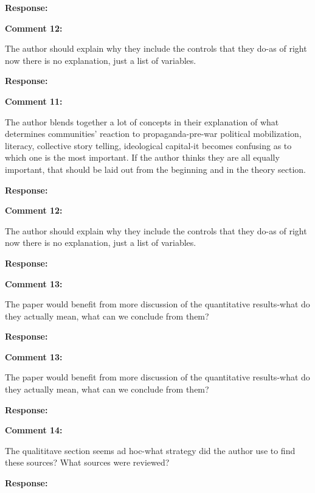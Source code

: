 \documentclass[12pt, a4paper, notitlepage]{article}
\begin{document}
\noindent\textbf{Response:}

\vspace{15pt}
\noindent\textbf{Comment 12:}
\begin{displayquote}
The author should explain why they include the controls that they do-as of right now there is no explanation, just a list of variables.
\end{displayquote}

\noindent\textbf{Response:}

\vspace{15pt}
\noindent\textbf{Comment 11:}
\begin{displayquote}
The author blends together a lot of concepts in their explanation of what determines communities' reaction to propaganda-pre-war political mobilization, literacy, collective story telling, ideological capital-it becomes confusing as to which one is the most important. If the author thinks they are all equally important, that should be laid out from the beginning and in the theory section.
\end{displayquote}

\noindent\textbf{Response:}



\vspace{15pt}
\noindent\textbf{Comment 12:}
\begin{displayquote}
The author should explain why they include the controls that they do-as of right now there is no explanation, just a list of variables.
\end{displayquote}

\noindent\textbf{Response:}



\vspace{15pt}
\noindent\textbf{Comment 13:}
\begin{displayquote}
The paper would benefit from more discussion of the quantitative results-what do they actually mean, what can we conclude from them?
\end{displayquote}

\noindent\textbf{Response:}


\vspace{15pt}
\noindent\textbf{Comment 13:}
\begin{displayquote}
The paper would benefit from more discussion of the quantitative results-what do they actually mean, what can we conclude from them?
\end{displayquote}

\noindent\textbf{Response:}

\vspace{15pt}
\noindent\textbf{Comment 14:}
\begin{displayquote}
The qualititave section seems ad hoc-what strategy did the author use to find these sources? What sources were reviewed?
\end{displayquote}


\noindent\textbf{Response:}


\newpage


\end{document}
